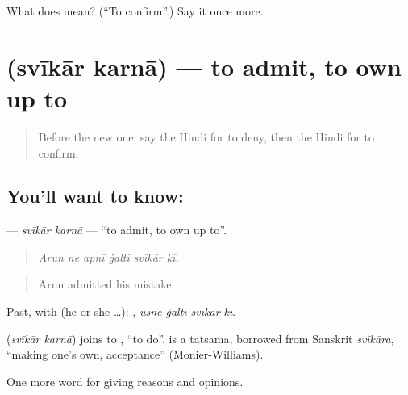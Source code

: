 \begin{tcolorbox}[breakable,colback=teal!4,colframe=teal!35!black,title={Before you move on}]
What does   mean? (\textquotedblleft{}To confirm\textquotedblright{}.) Say it once more.
\end{tcolorbox}
\section[\texorpdfstring{\hi{स्वीकार} \hi{करना} (svīkār karnā)}{स्वीकार करना (svīkār karnā)}]{  (svīkār karnā) — to admit, to own up to}

\label{lesson:HI-C349-svikarkarna}



\begin{quote}
Before the new one: say the Hindi for to deny, then the Hindi for to confirm.
\end{quote}

\subsection*{You'll want to know:  }
\textbf{ } — \emph{svīkār karnā} — \textquotedblleft{}to admit, to own up to\textquotedblright{}.

\begin{quote}
     
\end{quote}

\begin{quote}
\emph{Aruṇ ne apnī ġaltī svīkār kī.}
\end{quote}

\begin{quote}
Arun admitted his mistake.
\end{quote}

Past, with  (he or she …):    , \emph{usne ġaltī svīkār kī}.

\begin{cousinweb}
\textbf{ } (\emph{svīkār karnā}) joins  to , \textquotedblleft{}to do\textquotedblright{}.  is a tatsama, borrowed from Sanskrit \emph{svīkāra}, \textquotedblleft{}making one's own, acceptance\textquotedblright{} (Monier-Williams).
\end{cousinweb}

\begin{grammarlens}[title={What you've built}]
One more word for giving reasons and opinions.
\end{grammarlens}

